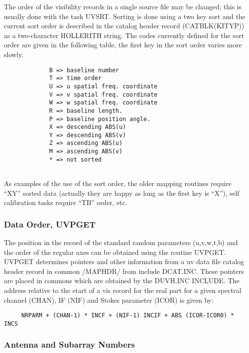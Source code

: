 The order of the visibility records in a single source file may be
changed; this is usually done with the task UVSRT.  Sorting is done
using a two key sort and the current sort order is described in the
catalog header record (CATBLK(KITYP)) as a two-character HOLLERITH string.
The codes currently defined for the sort order are given in the
following table, the first key in the sort order varies more slowly.
\begin{verbatim}
             B => baseline number
             T => time order
             U => u spatial freq. coordinate
             V => v spatial freq. coordinate
             W => w spatial freq. coordinate
             R => baseline length.
             P => baseline position angle.
             X => descending ABS(u)
             Y => descending ABS(v)
             Z => ascending ABS(u)
             M => ascending ABS(v)
             * => not sorted


\end{verbatim}
As examples of the use of the sort order, the older mapping routines
require ``XY'' sorted data (actually they are happy as long as the
first key is ``X''), self calibration tasks require ``TB'' order, etc.

\subsubsection{Data Order, UVPGET}
The position in the record of the standard random parameters
(u,v,w,t,b) and the order of the regular axes can be obtained using
the routine UVPGET. UVPGET determines pointers and other information
from a uv data file catalog header record in common /MAPHDR/ from
include DCAT.INC. These pointers are placed in commons which are
obtained by the DUVH.INC INCLUDE. The address relative
to the start of a vis record for the real part for a given spectral
channel (CHAN), IF (NIF) and Stokes parameter (ICOR) is given by:
\begin{verbatim}
     NRPARM + (CHAN-1) * INCF + (NIF-1) INCIF + ABS (ICOR-ICOR0) * INCS
\end{verbatim}

\subsubsection {Antenna and Subarray Numbers}

